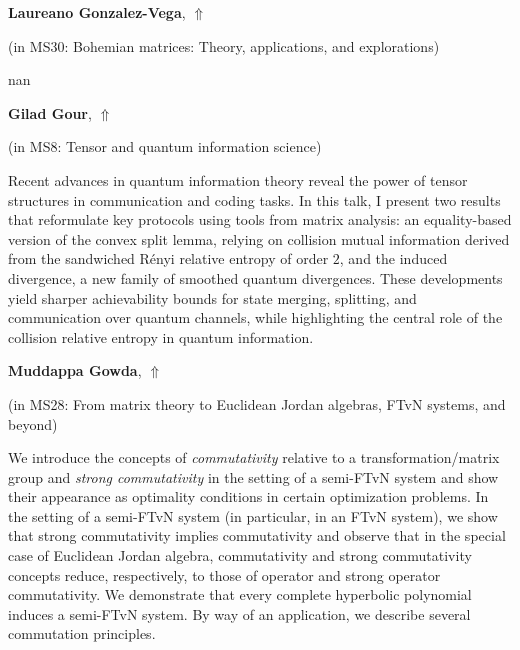 \documentclass[ILAS2025-program.tex]{subfiles}
\begin{document}
     \hypertarget{down0230}{}\begin{ilasabstract}
    
    \textbf{Laureano Gonzalez-Vega},  \hfill \hyperlink{up0230}{$\Uparrow$}
    
    (in {\color{mstitle}MS30: Bohemian matrices: Theory, applications, and explorations})
        
        \mtskip
    nan\end{ilasabstract}
     \hypertarget{down0053}{}\begin{ilasabstract}
    
    \textbf{Gilad Gour},  \hfill \hyperlink{up0053}{$\Uparrow$}
    
    (in {\color{mstitle}MS8: Tensor and quantum information science})
        
        \mtskip
    Recent advances in quantum information theory reveal the power of tensor structures in communication and coding tasks. In this talk, I present two results that reformulate key protocols using tools from matrix analysis: an equality-based version of the convex split lemma, relying on collision mutual information derived from the sandwiched R\'enyi relative entropy of order $2$, and the induced divergence, a new family of smoothed quantum divergences. These developments yield sharper achievability bounds for state merging, splitting, and communication over quantum channels, while highlighting the central role of the collision relative entropy in quantum information.\end{ilasabstract}
     \hypertarget{down0384}{}\begin{ilasabstract}
    
    \textbf{Muddappa Gowda},  \hfill \hyperlink{up0384}{$\Uparrow$}
    
    (in {\color{mstitle}MS28: From matrix theory to Euclidean Jordan algebras, FTvN systems, and beyond})
        
        \mtskip
    We introduce the concepts of {\it commutativity} relative to a transformation/matrix group and {\it strong commutativity} in the setting of a semi-FTvN system and show their appearance as optimality conditions in certain optimization problems. In the setting of a semi-FTvN system (in particular, in an FTvN system), we show that strong commutativity implies commutativity and observe that in the special case of Euclidean Jordan algebra, commutativity and strong commutativity concepts reduce, respectively, to those of operator and strong operator commutativity. We demonstrate that every complete hyperbolic polynomial induces a semi-FTvN system. By way of an application, we describe several commutation principles. 

\end{ilasabstract}
\end{document}
